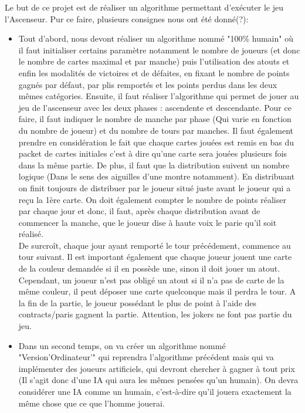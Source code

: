 \documentclass[12pt]{report}
\begin{document}
	Le but de ce projet est de réaliser un algorithme permettant d'exécuter le jeu l'Ascenseur. Pur ce faire, plusieurs consignes nous ont été donné(?): 
	\begin{itemize}
		\item  {Tout d'abord, nous devont réaliser un algorithme nommé "100\% humain" où il faut 
		initialiser certains paramètre notamment le nombre de joueurs (et donc le nombre de cartes maximal et par manche) puis l'utilisation des atouts et enfin les modalités de victoires et de défaites, en fixant le nombre de points gagnés par défaut, par plis remportés et les points perdus dans les deux mêmes catégories. Ensuite, il faut réaliser l'algorithme qui permet de jouer au jeu de l'ascenseur avec les deux phases : ascendente et descendante. Pour ce faire, il faut indiquer le nombre de manche par phase (Qui varie en fonction du nombre de joueur) et du nombre de tours par manches. Il faut également prendre en considération le fait que chaque cartes jouées est remis en bas du packet de cartes initiales c'est à dire qu'une carte sera jouées plusieurs fois dans la même partie. De plus, il faut que la distribution suivent un nombre logique (Dans le sens des aiguilles d'une montre notamment). En distribuant on finit toujours de distribuer par le joueur situé juste avant le joueur qui a reçu la 1ère carte. On doit également compter le nombre de points réaliser par chaque jour et donc, il faut, après chaque distribution avant de commencer la manche, que le joueur dise à haute voix le parie qu'il soit réalisé. \\ De surcroît, chaque jour ayant remporté le tour précédement, commence au tour suivant. Il est important également que chaque joueur jouent une carte de la couleur demandée si il en possède une, sinon il doit jouer un atout. Cependant, un joueur n'est pas obligé un atout si il n'a pas de carte de la même couleur, il peut déposer une carte quelconque mais il perdra le tour.
A la fin de la partie, le joueur possédant le plus de point à l'aide des contracts/paris gagnent la partie.  Attention, les jokers ne font pas partie du jeu.}
		\item {Dans un second temps, on va créer un algorithme nommé "Version'Ordinateur'" qui reprendra l'algorithme précédent mais qui va implémenter des joueurs artificiels, qui devront chercher à gagner à tout prix (Il s'agit donc d'une IA qui aura les mêmes pensées qu'un humain). On devra considérer une IA comme un humain, c'est-à-dire qu'il jouera exactement la même chose que ce que l'homme jouerai. } \\
		\\
	

\end{itemize}
\end{document}
